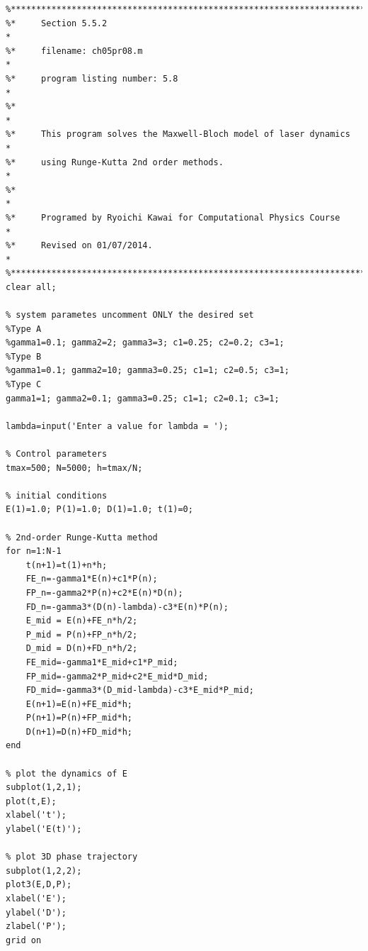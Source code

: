 
\bigskip
\noindent
\program
\label{prog:maxwell-bloch}

\footnotesize
\begin{verbatim}
%**************************************************************************
%*     Section 5.5.2                                                      *
%*     filename: ch05pr08.m                                               *
%*     program listing number: 5.8                                        *
%*                                                                        *
%*     This program solves the Maxwell-Bloch model of laser dynamics      *
%*     using Runge-Kutta 2nd order methods.                               *
%*                                                                        *
%*     Programed by Ryoichi Kawai for Computational Physics Course        *
%*     Revised on 01/07/2014.                                             *
%**************************************************************************
clear all;

% system parametes uncomment ONLY the desired set
%Type A
%gamma1=0.1; gamma2=2; gamma3=3; c1=0.25; c2=0.2; c3=1;
%Type B
%gamma1=0.1; gamma2=10; gamma3=0.25; c1=1; c2=0.5; c3=1;
%Type C 
gamma1=1; gamma2=0.1; gamma3=0.25; c1=1; c2=0.1; c3=1;

lambda=input('Enter a value for lambda = ');

% Control parameters
tmax=500; N=5000; h=tmax/N;

% initial conditions
E(1)=1.0; P(1)=1.0; D(1)=1.0; t(1)=0;

% 2nd-order Runge-Kutta method
for n=1:N-1
    t(n+1)=t(1)+n*h;
    FE_n=-gamma1*E(n)+c1*P(n);
    FP_n=-gamma2*P(n)+c2*E(n)*D(n);
    FD_n=-gamma3*(D(n)-lambda)-c3*E(n)*P(n);
    E_mid = E(n)+FE_n*h/2;
    P_mid = P(n)+FP_n*h/2;
    D_mid = D(n)+FD_n*h/2;
    FE_mid=-gamma1*E_mid+c1*P_mid;
    FP_mid=-gamma2*P_mid+c2*E_mid*D_mid;
    FD_mid=-gamma3*(D_mid-lambda)-c3*E_mid*P_mid;
    E(n+1)=E(n)+FE_mid*h;
    P(n+1)=P(n)+FP_mid*h;
    D(n+1)=D(n)+FD_mid*h;
end

% plot the dynamics of E
subplot(1,2,1);
plot(t,E);
xlabel('t');
ylabel('E(t)');

% plot 3D phase trajectory
subplot(1,2,2);
plot3(E,D,P);
xlabel('E');
ylabel('D');
zlabel('P');
grid on
\end{verbatim}
\normalsize


\bigskip
\noindent
\program
\label{prog:kuramoto}

